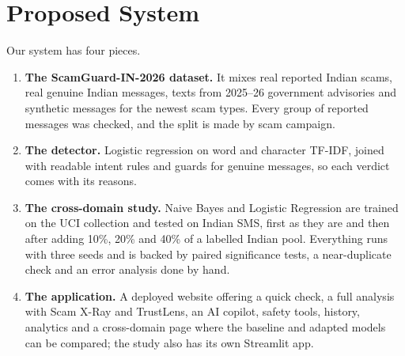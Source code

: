 \section{Proposed System}
Our system has four pieces.
\begin{enumerate}
\item \textbf{The ScamGuard-IN-2026 dataset.} It mixes real reported Indian scams, real genuine Indian messages, texts from 2025--26 government advisories and synthetic messages for the newest scam types. Every group of reported messages was checked, and the split is made by scam campaign.
\item \textbf{The detector.} Logistic regression on word and character TF-IDF, joined with readable intent rules and guards for genuine messages, so each verdict comes with its reasons.
\item \textbf{The cross-domain study.} Naive Bayes and Logistic Regression are trained on the UCI collection and tested on Indian SMS, first as they are and then after adding 10\%, 20\% and 40\% of a labelled Indian pool. Everything runs with three seeds and is backed by paired significance tests, a near-duplicate check and an error analysis done by hand.
\item \textbf{The application.} A deployed website offering a quick check, a full analysis with Scam X-Ray and TrustLens, an AI copilot, safety tools, history, analytics and a cross-domain page where the baseline and adapted models can be compared; the study also has its own Streamlit app.
\end{enumerate}
